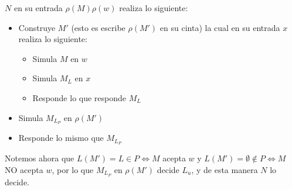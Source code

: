 \documentclass[dcc]{fcfmcourse}
\begin{document}
\begin{problems}
\begin{enumerate}[a)]
     $N$ en su entrada $\rho(M)\rho(w)$ realiza lo siguiente: 
     \begin{itemize}
         \item Construye $M'$ (esto es escribe $\rho(M')$ en su cinta) la cual en su entrada $x$ realiza lo siguiente:
         \begin{itemize}
             \item Simula $M$ en $w$
             \item Simula $M_{L}$ en $x$
             \item Responde lo que responde $M_{L}$
         \end{itemize}
         \item Simula $M_{L_{P}}$ en $\rho(M')$
         \item Responde lo mismo que $M_{L_{P}}$
     \end{itemize}
     Notemos ahora que $L(M') = L \in P \Leftrightarrow M$ acepta $w$ y $L(M') = \emptyset \not \in P \Leftrightarrow M$ NO acepta $w$, por lo que  $M_{L_{P}}$ en $\rho(M')$ decide $L_{u}$, y de esta manera $N$ lo decide.
     

\end{enumerate}
\end{problems}
\end{document}
